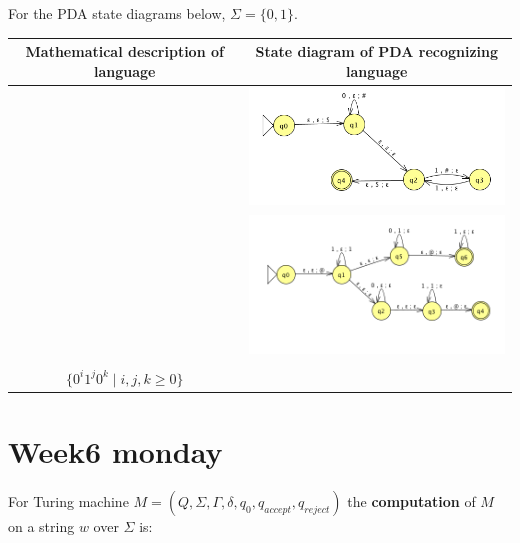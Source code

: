 \documentclass[12pt, oneside]{article}
\begin{document}
For the PDA state diagrams below, $\Sigma = \{0,1\}$.


\begin{center}
\begin{tabular}{c c}
Mathematical description of language & State diagram of PDA recognizing language\\
\hline
& \includegraphics[width=3.5in]{resources/machines/Lect10PDA1.png}\\
\hline
& \includegraphics[width=3.5in]{resources/machines/Lect10PDA2.png}\\
\hline
& \\
$\{ 0^i 1^j 0^k \mid i,j,k \geq 0 \}$ & \\
\end{tabular}
\end{center}
 \vfill
\section*{Week6 monday}


For Turing machine $M= (Q, \Sigma, \Gamma, \delta, q_0, q_{accept}, q_{reject})$ 
the {\bf computation} of $M$ on a string $w$ over $\Sigma$  is:

\vspace{-20pt}
\end{document}

